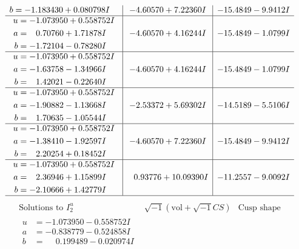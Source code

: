 \documentclass[1p]{elsarticle_modified}
\theoremstyle{definition}
\newcommand{\I}{\sqrt{-1}}
\begin{document}
$$\begin{array}{c|c|c}
\begin{aligned}
b &= -1.183430 + 0.080798 I\end{aligned}
 & -4.60570 + 7.22360 I & -15.4849 - 9.9412 I \\ \hline\begin{aligned}
u &= -1.073950 + 0.558752 I \\
a &= \phantom{-}0.70760 + 1.71878 I \\
b &= -1.72104 - 0.78280 I\end{aligned}
 & -4.60570 + 4.16244 I & -15.4849 - 1.0799 I \\ \hline\begin{aligned}
u &= -1.073950 + 0.558752 I \\
a &= -1.63758 - 1.34966 I \\
b &= \phantom{-}1.42021 - 0.22640 I\end{aligned}
 & -4.60570 + 4.16244 I & -15.4849 - 1.0799 I \\ \hline\begin{aligned}
u &= -1.073950 + 0.558752 I \\
a &= -1.90882 - 1.13668 I \\
b &= \phantom{-}1.70635 - 1.05544 I\end{aligned}
 & -2.53372 + 5.69302 I & -14.5189 - 5.5106 I \\ \hline\begin{aligned}
u &= -1.073950 + 0.558752 I \\
a &= -1.38410 - 1.92597 I \\
b &= \phantom{-}2.20254 + 0.18452 I\end{aligned}
 & -4.60570 + 7.22360 I & -15.4849 - 9.9412 I \\ \hline\begin{aligned}
u &= -1.073950 + 0.558752 I \\
a &= \phantom{-}2.36946 + 1.15899 I \\
b &= -2.10666 + 1.42779 I\end{aligned}
 & \phantom{-}0.93776 + 10.09390 I & -11.2557 - 9.0092 I\\
 \hline 
 \end{array}$$\newpage$$\begin{array}{c|c|c}  
\text{Solutions to }I^u_{2}& \I (\text{vol} + \sqrt{-1}CS) & \text{Cusp shape}\\
 \hline 
\begin{aligned}
u &= -1.073950 - 0.558752 I \\
a &= -0.838779 - 0.524858 I \\
b &= \phantom{-}0.199489 - 0.020974 I\end{aligned}

\end{array}$$
\end{document}
